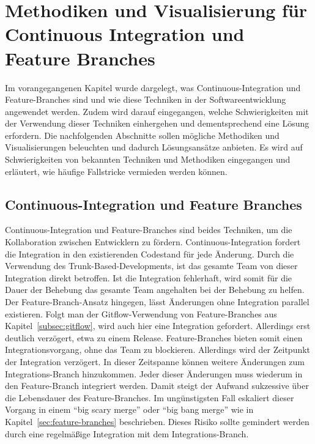 \chapter{Methodiken und Visualisierung für Continuous Integration und Feature Branches}
\label{ch:visu_meth}

Im vorangegangenen Kapitel wurde dargelegt, was Continuous-Integration und Feature-Branches sind und wie diese Techniken in der Softwareentwicklung angewendet werden. Zudem wird darauf eingegangen, welche Schwierigkeiten mit der Verwendung dieser Techniken einhergehen und dementsprechend eine Lösung erfordern. 
Die nachfolgenden Abschnitte sollen mögliche Methodiken und Visualisierungen beleuchten und dadurch Lösungsansätze anbieten. Es wird auf Schwierigkeiten von bekannten Techniken und Methodiken eingegangen und erläutert, wie häufige Fallstricke vermieden werden können.

\section{Continuous-Integration und Feature Branches}

Continuous-Integration und Feature-Branches sind beides Techniken, um die Kollaboration zwischen Entwicklern zu fördern. Continuous-Integration fordert die Integration in den existierenden Codestand für jede Änderung. Durch die Verwendung des Trunk-Based-Developments, ist das gesamte Team von dieser Integration direkt betroffen. Ist die Integration fehlerhaft, wird somit für die Dauer der Behebung das gesamte Team angehalten bei der Behebung zu helfen. Der Feature-Branch-Ansatz hingegen, lässt Änderungen ohne Integration parallel existieren. Folgt man der Gitflow-Verwendung von Feature-Branches aus Kapitel~\ref{subsec:gitflow}, wird auch hier eine Integration gefordert. Allerdings erst deutlich verzögert, etwa zu  einem Release. Feature-Branches bieten somit einen Integrationsvorgang, ohne das Team zu blockieren. Allerdings wird der Zeitpunkt der Integration verzögert. In dieser Zeitspanne können weitere Änderungen zum Integrations-Branch hinzukommen. Jeder dieser Änderungen muss wiederum in den Feature-Branch integriert werden. Damit steigt der Aufwand sukzessive über die Lebensdauer des Feature-Branches. Im ungünstigsten Fall eskaliert dieser Vorgang in einem ``big scary merge'' oder ``big bang merge'' wie in Kapitel~\ref{sec:feature-branches} beschrieben. Dieses Risiko sollte gemindert werden durch eine regelmäßige Integration mit dem Integrations-Branch. 

